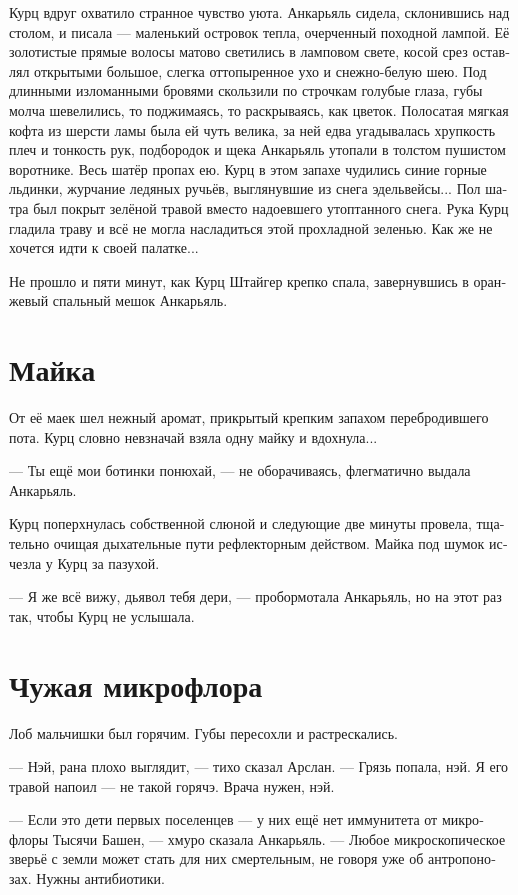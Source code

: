 \documentclass[a4paper,12pt,fleqn]{book}\usepackage{polyglossia}\setdefaultlanguage[babelshorthands=true]{russian}\setotherlanguage{english}\defaultfontfeatures{Ligatures=TeX,Mapping=tex-text}\usepackage{xcolor}\newcommand{\ml}[3]{#2}
\begin{document}
Курц вдруг охватило странное чувство уюта.
Анкарьяль сидела, склонившись над столом, и писала --- маленький островок тепла, очерченный походной лампой.
Её золотистые прямые волосы матово светились в ламповом свете, косой срез оставлял открытыми большое, слегка оттопыренное ухо и снежно-белую шею.
Под длинными изломанными  бровями скользили по строчкам голубые глаза, губы молча шевелились, то поджимаясь, то раскрываясь, как цветок.
Полосатая мягкая кофта из шерсти ламы была ей чуть велика, за ней едва угадывалась хрупкость плеч и тонкость рук, подбородок и щека Анкарьяль утопали в толстом пушистом воротнике.
Весь шатёр пропах ею.
Курц в этом запахе чудились синие горные льдинки, журчание ледяных ручьёв, выглянувшие из снега эдельвейсы...
Пол шатра был покрыт зелёной травой вместо надоевшего утоптанного снега.
Рука Курц гладила траву и всё не могла насладиться этой прохладной зеленью.
Как же не хочется идти к своей палатке...

Не прошло и пяти минут, как Курц Штайгер крепко спала, завернувшись в оранжевый спальный мешок Анкарьяль.

\section{Майка}

От её маек шел нежный аромат, прикрытый крепким запахом перебродившего пота.
Курц словно невзначай взяла одну майку и вдохнула...

--- Ты ещё мои ботинки понюхай, --- не оборачиваясь, флегматично выдала Анкарьяль.

Курц поперхнулась собственной слюной и следующие две минуты провела, тщательно очищая дыхательные пути рефлекторным действом.
Майка под шумок исчезла у Курц за пазухой.

--- Я же всё вижу, дьявол тебя дери, --- пробормотала Анкарьяль, но на этот раз так, чтобы Курц не услышала.

\section{Чужая микрофлора}

Лоб мальчишки был горячим.
Губы пересохли и растрескались.

--- Нэй, рана плохо выглядит, --- тихо сказал Арслан.
--- Грязь попала, нэй.
Я его травой напоил --- не такой горячэ.
Врача нужен, нэй.

--- Если это дети первых поселенцев --- у них ещё нет иммунитета от микрофлоры Тысячи Башен, --- хмуро сказала Анкарьяль.
--- Любое микроскопическое зверьё с земли может стать для них смертельным, не говоря уже об антропонозах.
Нужны антибиотики.
\end{document}
